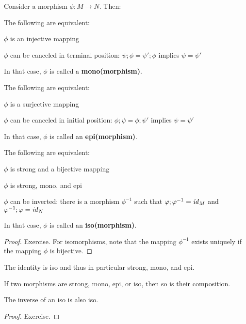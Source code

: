 \begin{theorem}
Consider a morphism $\phi:M\to N$.
Then:
\begin{compactitem}
\item The following are equivalent:
	\begin{compactitem}
	\item $\phi$ is an injective mapping
	\item $\phi$ can be canceled in terminal position: $\psi;\phi=\psi';\phi$ implies $\psi=\psi'$
	\end{compactitem}
	In that case, $\phi$ is called a \textbf{mono(morphism)}.
\item The following are equivalent:
	\begin{compactitem}
	\item $\phi$ is a surjective mapping
	\item $\phi$ can be canceled in initial position: $\phi;\psi=\phi;\psi'$ implies $\psi=\psi'$
	\end{compactitem}
	In that case, $\phi$ is called an \textbf{epi(morphism)}.
\item The following are equivalent:
	\begin{compactitem}
	\item $\phi$ is strong and a bijective mapping
	\item $\phi$ is strong, mono, and epi
	\item $\phi$ can be inverted: there is a morphism $\phi^{-1}$ such that $\varphi;\varphi^{-1}=\mathit{id}_{M}$ and $\varphi^{-1};\varphi=\mathit{id}_{N}$
	\end{compactitem}
	In that case, $\phi$ is called an \textbf{iso(morphism)}.
\end{compactitem}
\end{theorem}
\begin{proof}
Exercise.
For isomorphisms, note that the mapping $\phi^{-1}$ exists uniquely if the mapping $\phi$ is bijective.
\end{proof}

\begin{theorem}
The identity is iso and thus in particular strong, mono, and epi.

If two morphisms are strong, mono, epi, or iso, then so is their composition.

The inverse of an iso is also iso.
\end{theorem}
\begin{proof}
Exercise.
\end{proof}


